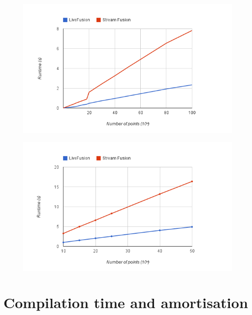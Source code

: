 \documentclass[preamble.tex]{subfiles}
\begin{document}
\begin{figure}
\includegraphics[center]{img/Eval-FarAndAboves}
\end{figure}

\begin{figure}
\includegraphics[center]{img/Eval-FarAndAboves-Overall}
\end{figure}

\clearpage
\section{Compilation time and amortisation}


\IfNotCompilingAll{}
\end{document}
